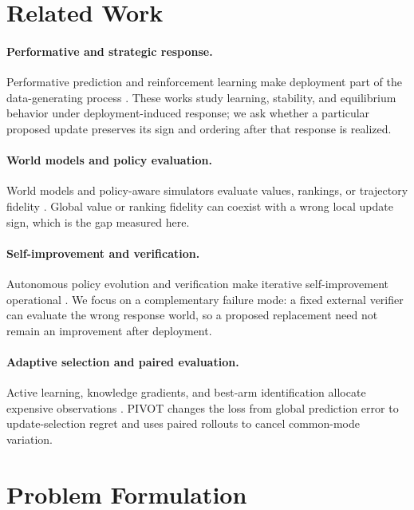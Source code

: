 \documentclass{article}
\begin{document}
\section{Related Work}
\paragraph{Performative and strategic response.}
Performative prediction and reinforcement learning make deployment part of
the data-generating process
\cite{perdomo2020performative,mandal2023performative,rank2024performative,
mandal2025linear,gois2025performative,multiagentperformative2022}.
These works study learning, stability, and equilibrium behavior under
deployment-induced response; we ask whether a particular proposed update
preserves its sign and ordering after that response is realized.

\paragraph{World models and policy evaluation.}
World models and policy-aware simulators evaluate values, rankings, or
trajectory fidelity
\cite{worldgym2025,policyaware2026,tdmpc22024}.
Global value or ranking fidelity can coexist with a wrong local update sign,
which is the gap measured here.

\paragraph{Self-improvement and verification.}
Autonomous policy evolution and verification make iterative self-improvement
operational \cite{evopolicygym2026,dgm2025,selfauthored2026,wu2024progress}.
We focus on a complementary failure mode: a fixed external verifier can
evaluate the wrong response world, so a proposed replacement need not remain
an improvement after deployment.

\paragraph{Adaptive selection and paired evaluation.}
Active learning, knowledge gradients, and best-arm identification allocate
expensive observations \cite{settles2009active,lindley1956information,
frazier2009kg,chick2001selection,kalyanakrishnan2012pac}. PIVOT changes the
loss from global prediction error to update-selection regret and uses paired
rollouts to cancel common-mode variation.

\section{Problem Formulation}
\end{document}
